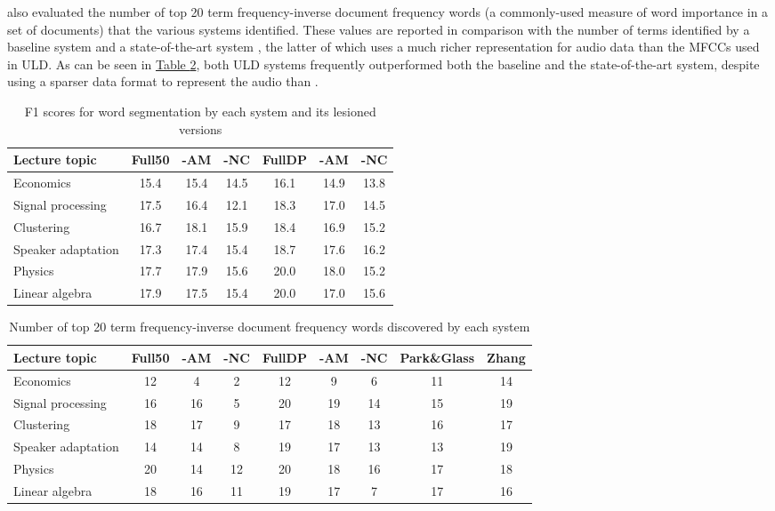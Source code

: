 \documentclass[12pt,letterpaper]{article}
\begin{document}
\noindent \citet{lee:2015} also evaluated the number of top 20 term frequency-inverse document frequency words (a commonly-used measure of word importance in a set of documents) that the various systems identified. These values are reported in comparison with the number of terms identified by a baseline system \citep{park:2008} and a state-of-the-art system \citep{zhang:2013}, the latter of which uses a much richer representation for audio data than the MFCCs used in ULD. As can be seen in  \hyperref[table3]{Table \ref*{table3}}, both ULD systems frequently outperformed both the baseline and the state-of-the-art system, despite using a sparser data format to represent the audio than \citet{zhang:2013}. 


\begin{table}
\begin{tabular}{|l||c|c|c||c|c|c|}
\hline
Lecture topic&Full50&-AM&-NC&FullDP&-AM&-NC \\
\hline \hline
Economics&15.4&15.4&14.5&16.1&14.9&13.8\\
\hline
Signal processing&17.5&16.4&12.1&18.3&17.0&14.5\\
\hline
Clustering&16.7&18.1&15.9&18.4&16.9&15.2\\
\hline
Speaker adaptation&17.3&17.4&15.4&18.7&17.6&16.2\\
\hline
Physics&17.7&17.9&15.6&20.0&18.0&15.2\\
\hline
Linear algebra&17.9&17.5&15.4&20.0&17.0&15.6\\
\hline

\end{tabular}
\caption{F1 scores for word segmentation by each system and its lesioned versions\protect\citep{lee:2015}}
\label{table2}
\end{table}

\begin{table}
\begin{tabular}{|l||c|c|c||c|c|c||c|c|}
\hline
Lecture topic&Full50&-AM&-NC&FullDP&-AM&-NC&Park\&Glass&Zhang\\
\hline \hline
Economics&12&4&2&12&9&6&11&14\\
\hline
Signal processing&16&16&5&20&19&14&15&19\\
\hline
Clustering&18&17&9&17&18&13&16&17\\
\hline
Speaker adaptation&14&14&8&19&17&13&13&19\\
\hline
Physics&20&14&12&20&18&16&17&18\\
\hline
Linear algebra&18&16&11&19&17&7&17&16\\
\hline
\end{tabular}
\caption{Number of top 20 term frequency-inverse document frequency words discovered by each system \protect\citep{lee:2015}}
\label{table3}
\end{table}
\end{document}
